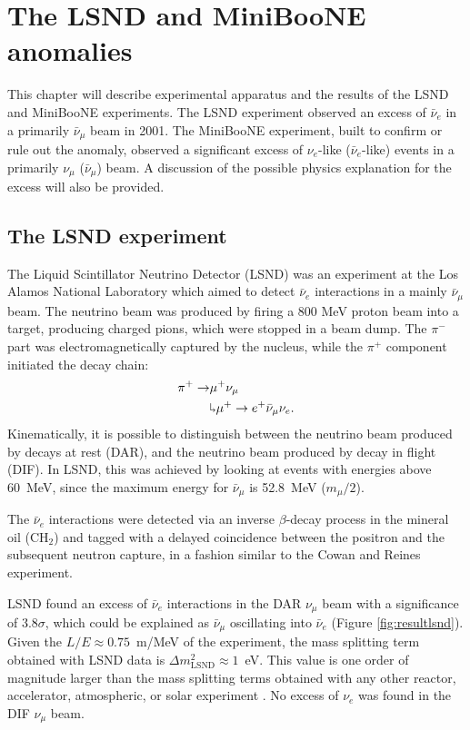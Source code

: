 \chapter{The LSND and MiniBooNE anomalies}

\minitoc

This chapter will describe experimental apparatus and the results of the LSND and MiniBooNE experiments. The LSND experiment observed an excess of $\bar{\nu}_{e}$ in a primarily $\bar{\nu}_{\mu}$ beam in 2001. The MiniBooNE experiment, built to confirm or rule out the anomaly, observed a significant excess of $\nu_{e}$-like ($\bar{\nu}_{e}$-like) events in a primarily $\nu_{\mu}$ ($\bar{\nu}_{\mu}$) beam. A discussion of the possible physics explanation for the excess will also be provided.

\section{The LSND experiment}
The Liquid Scintillator Neutrino Detector (LSND) was an experiment at the Los Alamos National Laboratory which aimed to detect $\bar{\nu}_e$ interactions in a mainly $\bar{\nu}_{\mu}$ beam. The neutrino beam was produced by firing a 800 MeV proton beam into a target, producing charged pions, which were stopped in a beam dump. The $\pi^-$ part was electromagnetically captured by the nucleus, while the $\pi^+$ component initiated the decay chain:
\begin{align}
    \pi^+ \rightarrow & \mu^+\nu_{\mu}\\
    & \rotatebox[origin=c]{180}{$\Lsh$}	 \mu^{+} \rightarrow e^+\bar{\nu}_{\mu}\nu_{e}.
\end{align}
Kinematically, it is possible to distinguish between the neutrino beam produced by decays at rest (DAR), and the neutrino beam produced by decay in flight (DIF). In LSND, this was achieved by looking at events with energies above 60~MeV, since the maximum energy for $\bar{\nu}_{\mu}$ is 52.8~MeV ($m_{\mu}/2$).

The $\bar{\nu}_e$ interactions were detected via an inverse $\beta$-decay process in the mineral oil (CH$_2$) and tagged with a delayed coincidence between the positron and the subsequent neutron capture, in a fashion similar to the Cowan and Reines experiment. 

LSND found an excess of $\bar{\nu}_e$ interactions in the DAR $\nu_{\mu}$ beam with a significance of $3.8\sigma$, which could be explained as $\bar{\nu}_\mu$ oscillating into $\bar{\nu}_e$ (Figure \ref{fig:resultlsnd}). Given the $L/E\approx0.75$~m/MeV of the experiment, the mass splitting term obtained with LSND data is $\Delta m_{\mathrm{LSND}}^2\approx1$~eV. This value is one order of magnitude larger than the mass splitting terms obtained with any other reactor, accelerator, atmospheric, or solar experiment \cite{Aguilar:2001ty}. No excess of $\nu_{e}$ was found in the DIF $\nu_{\mu}$ beam. 

